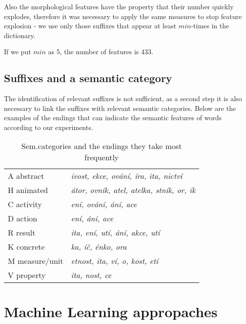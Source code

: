 \documentclass[letterpaper]{article}
\begin{document}
Also the morphological features have the property that their number quickly explodes, therefore it was necessary to apply the same measures to stop feature explosion - we use only those suffixes that appear at least $min$-times in the dictionary.

If we put $min$ as 5, the number of features is 433.

\subsection{Suffixes and a semantic category}
The identification of relevant suffixes is not sufficient,
as a second step it is also necessary to link the suffixes with relevant semantic categories. 
Below are the examples of the endings that
can indicate the semantic features of words according to our experiments.

\begin{table}[!h]
\begin{tabular}{ll}
\hline
A abstract & \textit{ivost, ekce, ování, íra, ita, nictví}\\
H animated & \textit{átor, ovník, atel, atelka, stník, or, ík}\\
C activity & \textit{ení, ování, ání, ace}\\
D action  & \textit{ení, ání, ace}\\
R result & \textit{ ita, ení, utí, ání, akce, utí}\\
K concrete & \textit{ka, íč, énko, ora}\\
M measure/unit & \textit{etnost, ita, ví, o, kost, etí}\\
V property & \textit{ita, nost, ce}\\
\hline
\end{tabular}
\caption{Sem.categories and the endings they take most frequently}
\end{table}




\section{Machine Learning appropaches}
\end{document}
